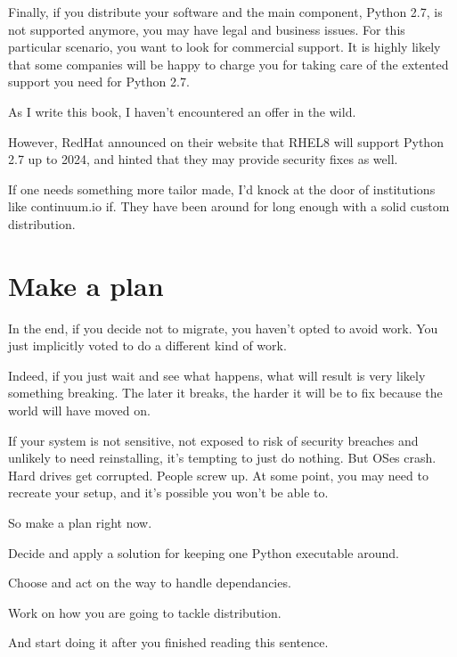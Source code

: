 Finally, if you distribute your software and the main component, Python 2.7, is not supported anymore, you may have legal and business issues. For this particular scenario, you want to look for commercial support. It is highly likely that some companies will be happy to charge you for taking care of the extented support you need for Python 2.7.

As I write this book, I haven't encountered an offer in the wild.

However, RedHat announced on their website that RHEL8 will support Python 2.7 up to 2024, and hinted that they may provide security fixes as well.

If one needs something more tailor made, I'd knock at the door of institutions like continuum.io if. They have been around for long enough with a solid custom distribution.

\section{Make a plan}

In the end, if you decide not to migrate, you haven't opted to avoid work. You just implicitly voted to do a different kind of work.

Indeed, if you just wait and see what happens, what will result is very likely something breaking. The later it breaks, the harder it will be to fix because the world will have moved on.

If your system is not sensitive, not exposed to risk of security breaches and unlikely to need reinstalling, it's tempting to just do nothing. But OSes crash. Hard drives get corrupted. People screw up. At some point, you may need to recreate your setup, and it's possible you won't be able to.

So make a plan right now.

Decide and apply a solution for keeping one Python executable around.

Choose and act on the way to handle dependancies.

Work on how you are going to tackle distribution.

And start doing it after you finished reading this sentence.


